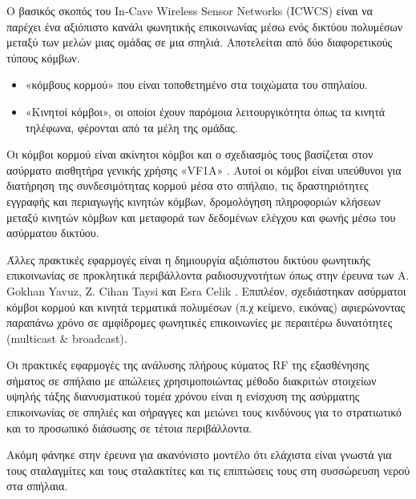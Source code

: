     Ο βασικός σκοπός του In-Cave Wireless
    Sensor Networks (ICWCS) είναι να παρέχει ένα αξιόπιστο κανάλι φωνητικής επικοινωνίας
    μέσω ενός δικτύου πολυμέσων μεταξύ των μελών μιας ομάδας σε μια σπηλιά. Αποτελείται
    από δύο διαφορετικούς τύπους κόμβων. 
    \begin{itemize}
        \item «κόμβους κορμού» που είναι τοποθετημένο στα τοιχώματα του σπηλαίου.
        \item «Κινητοί κόμβοι», οι οποίοι έχουν παρόμοια λειτουργικότητα όπως τα κινητά
        τηλέφωνα, φέρονται από τα μέλη της ομάδας.
    \end{itemize}

    Οι κόμβοι κορμού είναι ακίνητοι
    κόμβοι και ο σχεδιασμός τους βασίζεται στον ασύρματο αισθητήρα γενικής
    χρήσης «VF1A» \cite{walsh_communications_2018}.
    Αυτοί οι κόμβοι είναι υπεύθυνοι για διατήρηση της συνδεσιμότητας κορμού μέσα 
    στο σπήλαιο, τις δραστηριότητες
    εγγραφής και περιαγωγής κινητών κόμβων, δρομολόγηση πληροφοριών κλήσεων μεταξύ
    κινητών κόμβων και μεταφορά των δεδομένων ελέγχου και φωνής μέσω του ασύρματου
    δικτύου.

    Άλλες πρακτικές εφαρμογές είναι η δημιουργία αξιόπιστου δικτύου φωνητικής επικοινωνίας
    σε προκλητικά περιβάλλοντα ραδιοσυχνοτήτων όπως στην έρευνα των A. Gokhan Yavuz, 
    Z. Cihan Taysi και Esra Celik \cite{yavuz_-cave_2009}. Επιπλέον, σχεδιάστηκαν
    ασύρματοι κόμβοι κορμού και κινητά τερματικά πολυμέσων (π.χ κείμενο, εικόνας) 
    αφιερώνοντας παραπάνω χρόνο σε αμφίδρομες φωνητικές επικοινωνίες με περαιτέρω
    δυνατότητες (multicast \& broadcast).

    Οι πρακτικές εφαρμογές της ανάλυσης πλήρους κύματος RF της εξασθένησης σήματος σε σπήλαιο
    με απώλειες χρησιμοποιώντας μέθοδο διακριτών στοιχείων υψηλής τάξης διανυσματικού τομέα
    χρόνου \cite{pingenot_full_2005} είναι η ενίσχυση της ασύρματης επικοινωνίας σε σπηλιές
    και σήραγγες και μειώνει τους κινδύνους για το στρατιωτικό και το προσωπικό διάσωσης σε τέτοια
    περιβάλλοντα.

    Ακόμη φάνηκε στην έρευνα για ακανόνιστο μοντέλο \cite{soo_measurement_2019} ότι ελάχιστα
    είναι γνωστά για τους σταλαγμίτες και τους σταλακτίτες και τις επιπτώσεις τους στη 
    συσσώρευση νερού στα σπήλαια.


